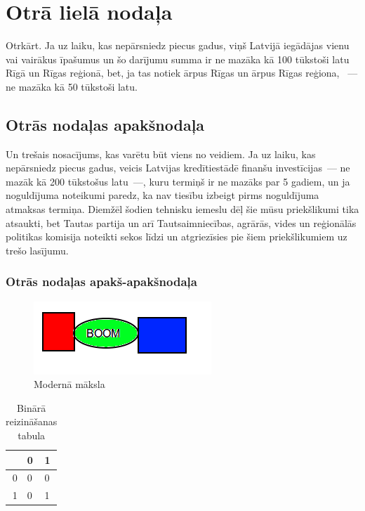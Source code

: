 \documentclass{LU-nosleguma}
\begin{document}
\section{Otrā lielā nodaļa}
Otrkārt. Ja uz laiku, kas nepārsniedz piecus gadus, viņš Latvijā iegādājas vienu vai vairākus īpašumus un šo darījumu
summa ir ne mazāka kā 100 tūkstoši latu Rīgā un Rīgas reģionā, bet, ja tas notiek ārpus Rīgas un ārpus Rīgas reģiona,
~--- ne mazāka kā 50 tūkstoši latu.

\subsection{Otrās nodaļas apakšnodaļa}
Un trešais nosacījums, kas varētu būt viens no veidiem. Ja uz laiku, kas nepārsniedz piecus gadus, veicis Latvijas 
kredītiestādē finanšu investīcijas~--- ne mazāk kā 200 tūkstošus latu~---, kuru termiņš ir ne mazāks par 5 gadiem, 
un ja noguldījuma noteikumi paredz, ka nav tiesību izbeigt pirms noguldījuma atmaksas termiņa.
Diemžēl šodien tehnisku iemeslu dēļ šie mūsu priekšlikumi tika atsaukti, bet Tautas partija un arī Tautsaimniecības, 
agrārās, vides un reģionālās politikas komisija noteikti sekos līdzi un atgriezīsies pie šiem priekšlikumiem uz trešo 
lasījumu.

\subsubsection{Otrās nodaļas apakš-apakšnodaļa}

\begin{figure}
	\centering
	\includegraphics{maksla.png}
	\caption{Modernā māksla}
\end{figure}

\begin{table}
	\caption{Binārā reizināšanas tabula}
	\centering
	\begin{tabular}{r | l | l |}
		  & 0 & 1\\ \hline
		0 & 0 & 0\\ \hline
		1 & 0 & 1\\ \hline
	\end{tabular}
\end{table}

\renewcommand\refname{Izmantotā literatūra un avoti}


\end{document}
